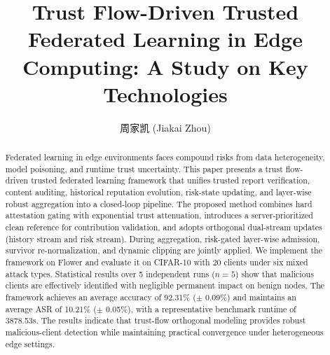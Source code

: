 \documentclass[runningheads]{llncs}
\begin{document}
\title{Trust Flow-Driven Trusted Federated Learning in Edge Computing: A Study on Key Technologies}
\author{周家凯 (Jiakai Zhou)}

\maketitle

\begin{abstract}
Federated learning in edge environments faces compound risks from data
heterogeneity, model poisoning, and runtime trust uncertainty. This paper presents
a trust flow-driven trusted federated learning framework that unifies trusted
report verification, content auditing, historical reputation evolution, risk-state
updating, and layer-wise robust aggregation into a closed-loop pipeline. The
proposed method combines hard attestation gating with exponential trust
attenuation, introduces a server-prioritized clean reference for contribution
validation, and adopts orthogonal dual-stream updates (history stream and risk
stream). During aggregation, risk-gated layer-wise admission, survivor re-normalization,
and dynamic clipping are jointly applied. We implement the framework on Flower and evaluate it on CIFAR-10 with 20 clients
under six mixed attack types. Statistical results over 5 independent runs
($n=5$) show that malicious clients are effectively identified with
negligible permanent impact on benign nodes. The framework achieves an average
accuracy of 92.31\% ($\pm$ 0.09\%) and maintains an average ASR of 10.21\% ($\pm$ 0.05\%), with a
representative benchmark runtime of 3878.53s. The results indicate that
trust-flow orthogonal modeling provides robust malicious-client detection
while maintaining practical convergence under heterogeneous edge settings.

\end{abstract}
\end{document}
